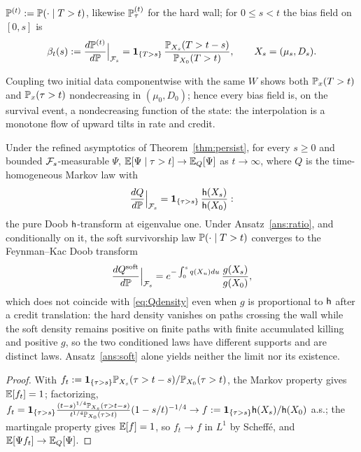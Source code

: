\begin{definition}
\label{def:interp}
$\mathbb{P}^{(t)}:=\mathbb{P}(\cdot\mid T>t)$, likewise $\mathbb{P}^{(t)}_\tau$ for the
hard wall; for $0\le s<t$ the bias field on $[0,s]$ is
\begin{equation}\label{eq:bias}
\beta_t(s):=\frac{d\mathbb{P}^{(t)}}{d\mathbb{P}}\Big|_{\mathcal{F}_s}
=\mathbf{1}_{\{T>s\}}\,\frac{\mathbb{P}_{X_s}(T>t-s)}{\mathbb{P}_{X_0}(T>t)},
\qquad X_s=(\mu_s,D_s).
\end{equation}
\end{definition}

\begin{lemma}\label{lem:monotone}
Coupling two initial data componentwise with the same $W$ shows both
$\mathbb{P}_x(T>t)$ and $\mathbb{P}_x(\tau>t)$ nondecreasing in $(\mu_0,D_0)$;
hence every bias field is, on the survival event, a nondecreasing
function of the state: the interpolation is a monotone flow of upward
tilts in rate and credit.
\end{lemma}

\begin{theorem}\label{thm:Q}
Under the refined asymptotics of Theorem~\ref{thm:persist}, for every
$s\ge0$ and bounded $\mathcal{F}_s$-measurable $\Psi$,
$\mathbb{E}[\Psi\mid\tau>t]\to\mathbb{E}_Q[\Psi]$ as $t\to\infty$, where $Q$ is the
time-homogeneous Markov law with
\begin{equation}\label{eq:Qdensity}
\frac{dQ}{d\mathbb{P}}\Big|_{\mathcal{F}_s}
=\mathbf{1}_{\{\tau>s\}}\,\frac{\mathsf{h}(X_s)}{\mathsf{h}(X_0)}:
\end{equation}
the pure Doob $\mathsf{h}$-transform at eigenvalue one. Under
Ansatz~\ref{ans:ratio}, and conditionally on it, the soft
survivorship law $\mathbb{P}(\cdot\mid T>t)$ converges to the Feynman--Kac
Doob transform
\begin{equation}\label{eq:Qsoft}
\frac{dQ^{\mathrm{soft}}}{d\mathbb{P}}\Big|_{\mathcal{F}_s}
=e^{-\int_0^sq(X_u)du}\,\frac{g(X_s)}{g(X_0)},
\end{equation}
which does not coincide with \eqref{eq:Qdensity} even when $g$ is proportional to $\mathsf{h}$ after a credit translation: the hard density vanishes on paths crossing the wall while the soft density remains positive on finite paths with finite accumulated killing and positive $g$, so the two conditioned laws have different supports and are distinct laws. Ansatz~\ref{ans:soft}
alone yields neither the limit nor its existence.
\end{theorem}

\begin{proof}
With $f_t:=\mathbf{1}_{\{\tau>s\}}\mathbb{P}_{X_s}(\tau>t-s)/\mathbb{P}_{X_0}(\tau>t)$,
the Markov property gives $\mathbb{E}[f_t]=1$; factorizing,
$f_t=\mathbf{1}_{\{\tau>s\}}
\frac{(t-s)^{1/4}\mathbb{P}_{X_s}(\tau>t-s)}{t^{1/4}\mathbb{P}_{X_0}(\tau>t)}
(1-s/t)^{-1/4}\to f:=\mathbf{1}_{\{\tau>s\}}\mathsf{h}(X_s)/\mathsf{h}(X_0)$ a.s.; the
martingale property gives $\mathbb{E}[f]=1$, so $f_t\to f$ in $L^1$ by
Scheff\'e, and $\mathbb{E}[\Psi f_t]\to\mathbb{E}_Q[\Psi]$.
\end{proof}


